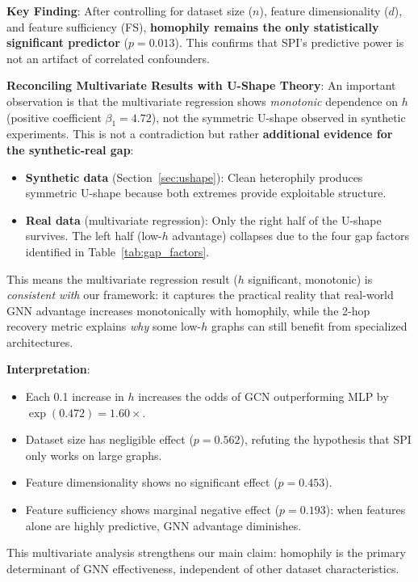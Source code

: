 \textbf{Key Finding}: After controlling for dataset size ($n$), feature dimensionality ($d$), and feature sufficiency (FS), \textbf{homophily remains the only statistically significant predictor} ($p = 0.013$). This confirms that SPI's predictive power is not an artifact of correlated confounders.

\textbf{Reconciling Multivariate Results with U-Shape Theory}: An important observation is that the multivariate regression shows \textit{monotonic} dependence on $h$ (positive coefficient $\beta_1 = 4.72$), not the symmetric U-shape observed in synthetic experiments. This is not a contradiction but rather \textbf{additional evidence for the synthetic-real gap}:

\begin{itemize}
    \item \textbf{Synthetic data} (Section~\ref{sec:ushape}): Clean heterophily produces symmetric U-shape because both extremes provide exploitable structure.
    \item \textbf{Real data} (multivariate regression): Only the right half of the U-shape survives. The left half (low-$h$ advantage) collapses due to the four gap factors identified in Table~\ref{tab:gap_factors}.
\end{itemize}

This means the multivariate regression result ($h$ significant, monotonic) is \textit{consistent with} our framework: it captures the practical reality that real-world GNN advantage increases monotonically with homophily, while the 2-hop recovery metric explains \textit{why} some low-$h$ graphs can still benefit from specialized architectures.

\textbf{Interpretation}:
\begin{itemize}
    \item Each 0.1 increase in $h$ increases the odds of GCN outperforming MLP by $\exp(0.472) = 1.60\times$.
    \item Dataset size has negligible effect ($p = 0.562$), refuting the hypothesis that SPI only works on large graphs.
    \item Feature dimensionality shows no significant effect ($p = 0.453$).
    \item Feature sufficiency shows marginal negative effect ($p = 0.193$): when features alone are highly predictive, GNN advantage diminishes.
\end{itemize}

This multivariate analysis strengthens our main claim: homophily is the primary determinant of GNN effectiveness, independent of other dataset characteristics.


